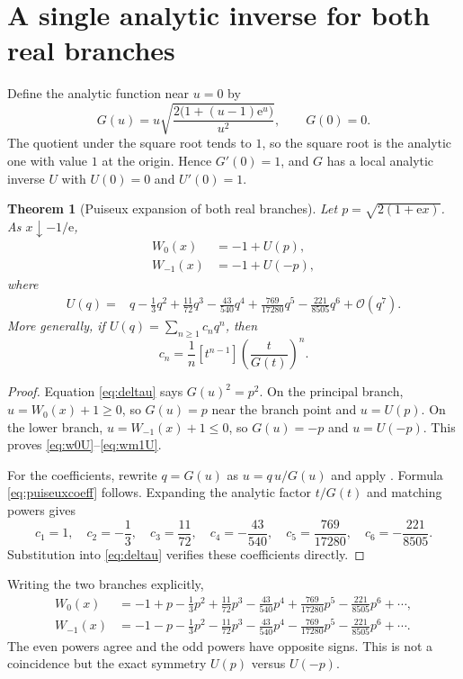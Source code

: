 \documentclass[11pt,oneside]{book}
\newtheorem{theorem}{Theorem}[chapter]
\theoremstyle{definition}
\theoremstyle{remark}
\newcommand{\ee}{\mathrm e}
\newcommand{\bigO}{\mathcal O}
\begin{document}
\section{A single analytic inverse for both real branches}

Define the analytic function near $u=0$ by
\begin{equation}\label{eq:Gdef}
 G(u)=u\sqrt{\frac{2\bigl(1+(u-1)\ee^u\bigr)}{u^2}},
 \qquad G(0)=0.
\end{equation}
The quotient under the square root tends to $1$, so the square root is the
analytic one with value $1$ at the origin.  Hence $G'(0)=1$, and $G$ has a
local analytic inverse $U$ with $U(0)=0$ and $U'(0)=1$.

\begin{theorem}[Puiseux expansion of both real branches]\label{thm:puiseux}
Let $p=\sqrt{2(1+\ee x)}$.  As $x\downarrow-1/\ee$,
\begin{align}
 W_0(x)&=-1+U(p),\label{eq:w0U}\\
 W_{-1}(x)&=-1+U(-p),\label{eq:wm1U}
\end{align}
where
\begin{align}
 U(q)={}&q-\frac13q^2+\frac{11}{72}q^3-\frac{43}{540}q^4
 +\frac{769}{17280}q^5-\frac{221}{8505}q^6+\bigO(q^7).
\label{eq:Useries}
\end{align}
More generally, if $U(q)=\sum_{n\ge1}c_nq^n$, then
\begin{equation}\label{eq:puiseuxcoeff}
 c_n=\frac1n[t^{n-1}]
 \left(\frac{t}{G(t)}\right)^n.
\end{equation}
\end{theorem}

\begin{proof}
Equation \eqref{eq:deltau} says $G(u)^2=p^2$.  On the principal branch,
$u=W_0(x)+1\ge0$, so $G(u)=p$ near the branch point and $u=U(p)$.  On the
lower branch, $u=W_{-1}(x)+1\le0$, so $G(u)=-p$ and $u=U(-p)$.  This proves
\eqref{eq:w0U}--\eqref{eq:wm1U}.

For the coefficients, rewrite $q=G(u)$ as
$u=q\,u/G(u)$ and apply .  Formula
\eqref{eq:puiseuxcoeff} follows.  Expanding the analytic factor $t/G(t)$ and
matching powers gives
\[
 c_1=1,\quad c_2=-\frac13,\quad c_3=\frac{11}{72},\quad
 c_4=-\frac{43}{540},\quad c_5=\frac{769}{17280},\quad
 c_6=-\frac{221}{8505}.
\]
Substitution into \eqref{eq:deltau} verifies these coefficients directly.
\end{proof}

Writing the two branches explicitly,
\begin{align}
 W_0(x)&=-1+p-\frac13p^2+\frac{11}{72}p^3-\frac{43}{540}p^4
 +\frac{769}{17280}p^5-\frac{221}{8505}p^6+\cdots,
 \label{eq:w0puiseux}\\
 W_{-1}(x)&=-1-p-\frac13p^2-\frac{11}{72}p^3-\frac{43}{540}p^4
 -\frac{769}{17280}p^5-\frac{221}{8505}p^6+\cdots.
 \label{eq:wm1puiseux}
\end{align}
The even powers agree and the odd powers have opposite signs.  This is not a
coincidence but the exact symmetry $U(p)$ versus $U(-p)$.
\end{document}
